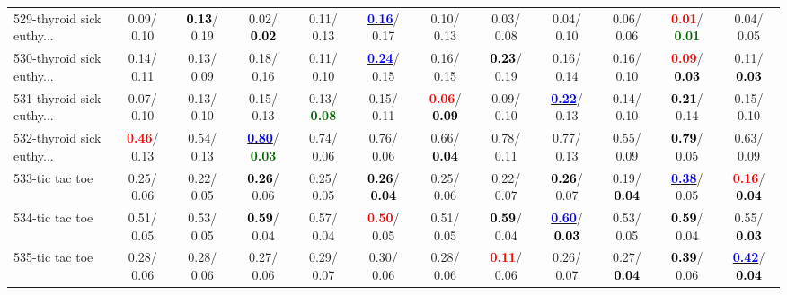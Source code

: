 \begin{table}[h]
\begin{center}
{\begin{tabular}{lc|c|c|c|c|c|c|c|c|c|c}
529-thyroid sick euthy... &   0.09/  0.10 & \textcolor{black}{\textbf{  0.13}}/  0.19 &   0.02/\textcolor{black}{\textbf{  0.02}} &   0.11/  0.13 & \underline{\textcolor{blue}{\textbf{  0.16}}}/  0.17 &   0.10/  0.13 &   0.03/  0.08 &   0.04/  0.10 &   0.06/  0.06 & \textcolor{red}{\textbf{  0.01}}/\textcolor{darkgreen}{\textbf{  0.01}} &   0.04/  0.05 \\
530-thyroid sick euthy... &   0.14/  0.11 &   0.13/  0.09 &   0.18/  0.16 &   0.11/  0.10 & \underline{\textcolor{blue}{\textbf{  0.24}}}/  0.15 &   0.16/  0.15 & \textcolor{black}{\textbf{  0.23}}/  0.19 &   0.16/  0.14 &   0.16/  0.10 & \textcolor{red}{\textbf{  0.09}}/\textcolor{black}{\textbf{  0.03}} &   0.11/\textcolor{black}{\textbf{  0.03}} \\
531-thyroid sick euthy... &   0.07/  0.10 &   0.13/  0.10 &   0.15/  0.13 &   0.13/\textcolor{darkgreen}{\textbf{  0.08}} &   0.15/  0.11 & \textcolor{red}{\textbf{  0.06}}/\textcolor{black}{\textbf{  0.09}} &   0.09/  0.10 & \underline{\textcolor{blue}{\textbf{  0.22}}}/  0.13 &   0.14/  0.10 & \textcolor{black}{\textbf{  0.21}}/  0.14 &   0.15/  0.10 \\
532-thyroid sick euthy... & \textcolor{red}{\textbf{  0.46}}/  0.13 &   0.54/  0.13 & \underline{\textcolor{blue}{\textbf{  0.80}}}/\textcolor{darkgreen}{\textbf{  0.03}} &   0.74/  0.06 &   0.76/  0.06 &   0.66/\textcolor{black}{\textbf{  0.04}} &   0.78/  0.11 &   0.77/  0.13 &   0.55/  0.09 & \textcolor{black}{\textbf{  0.79}}/  0.05 &   0.63/  0.09 \\
533-tic tac toe &   0.25/  0.06 &   0.22/  0.05 & \textcolor{black}{\textbf{  0.26}}/  0.06 &   0.25/  0.05 & \textcolor{black}{\textbf{  0.26}}/\textcolor{black}{\textbf{  0.04}} &   0.25/  0.06 &   0.22/  0.07 & \textcolor{black}{\textbf{  0.26}}/  0.07 &   0.19/\textcolor{black}{\textbf{  0.04}} & \underline{\textcolor{blue}{\textbf{  0.38}}}/  0.05 & \textcolor{red}{\textbf{  0.16}}/\textcolor{black}{\textbf{  0.04}} \\ \hline
534-tic tac toe &   0.51/  0.05 &   0.53/  0.05 & \textcolor{black}{\textbf{  0.59}}/  0.04 &   0.57/  0.04 & \textcolor{red}{\textbf{  0.50}}/  0.05 &   0.51/  0.05 & \textcolor{black}{\textbf{  0.59}}/  0.04 & \underline{\textcolor{blue}{\textbf{  0.60}}}/\textcolor{black}{\textbf{  0.03}} &   0.53/  0.05 & \textcolor{black}{\textbf{  0.59}}/  0.04 &   0.55/\textcolor{black}{\textbf{  0.03}} \\
535-tic tac toe &   0.28/  0.06 &   0.28/  0.06 &   0.27/  0.06 &   0.29/  0.07 &   0.30/  0.06 &   0.28/  0.06 & \textcolor{red}{\textbf{  0.11}}/  0.06 &   0.26/  0.07 &   0.27/\textcolor{black}{\textbf{  0.04}} & \textcolor{black}{\textbf{  0.39}}/  0.06 & \underline{\textcolor{blue}{\textbf{  0.42}}}/\textcolor{black}{\textbf{  0.04}} \\

\end{tabular}}
\end{center}
\end{table}
